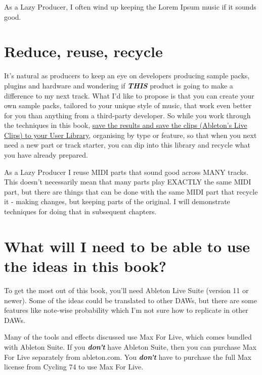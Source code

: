 \documentclass[
  12pt,
  letterpaper,
  oneside,
  open=any]{scrbook}
\begin{document}
As a Lazy Producer, I often wind up keeping the Lorem Ipsum music if it
sounds good.

\section*{Reduce, reuse, recycle}\label{reduce-reuse-recycle}


It's natural as producers to keep an eye on developers producing sample
packs, plugins and hardware and wondering if \textbf{\emph{THIS}}
product is going to make a difference to my next track. What I'd like to
propose is that you can create your own sample packs, tailored to your
unique style of music, that work even better for you than anything from
a third-party developer. So while you work through the techniques in
this book,
\href{https://www.ableton.com/en/live-manual/12/managing-files-and-sets/\#live-clips}{save
the results and save the clips (Ableton's Live Clips) to your User
Library}, organising by type or feature, so that when you next need a
new part or track starter, you can dip into this library and recycle
what you have already prepared.

As a Lazy Producer I reuse MIDI parts that sound good across MANY
tracks. This doesn't necessarily mean that many parts play EXACTLY the
same MIDI part, but there are things that can be done with the same MIDI
part that recycle it - making changes, but keeping parts of the
original. I will demonstrate techniques for doing that in subsequent
chapters.

\section*{What will I need to be able to use the ideas in this
book?}\label{what-will-i-need-to-be-able-to-use-the-ideas-in-this-book}


To get the most out of this book, you'll need Ableton Live Suite
(version 11 or newer). Some of the ideas could be translated to other
DAWs, but there are some features like note-wise probability which I'm
not sure how to replicate in other DAWs.

Many of the tools and effects discussed use Max For Live, which comes
bundled with Ableton Suite. If you \textbf{\emph{don't}} have Ableton
Suite, then you can purchase Max For Live separately from ableton.com.
You \textbf{\emph{don't}} have to purchase the full Max license from
Cycling 74 to use Max For Live.
\end{document}
